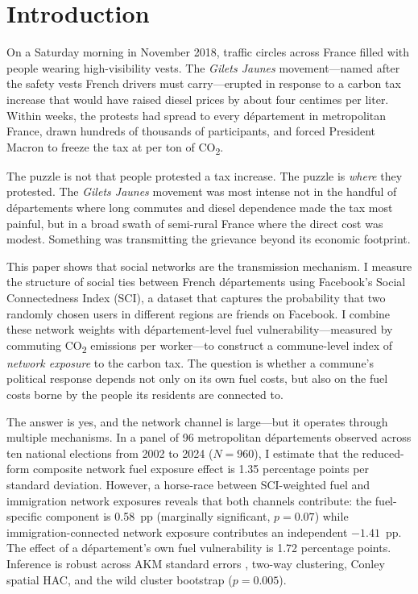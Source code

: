 \documentclass[12pt]{article}
\providecommand{\euro}{\texteuro}
\newcommand{\gj}{\textit{Gilets Jaunes}}
\newcommand{\dept}{d\'{e}partement}
\newcommand{\depts}{d\'{e}partements}
\begin{document}

\section{Introduction}
\label{sec:intro}

On a Saturday morning in November 2018, traffic circles across France filled with people wearing high-visibility vests. The \gj{} movement---named after the safety vests French drivers must carry---erupted in response to a carbon tax increase that would have raised diesel prices by about four centimes per liter. Within weeks, the protests had spread to every \dept{} in metropolitan France, drawn hundreds of thousands of participants, and forced President Macron to freeze the tax at \euro 44.60 per ton of CO\textsubscript{2}.

The puzzle is not that people protested a tax increase. The puzzle is \emph{where} they protested. The \gj{} movement was most intense not in the handful of \depts{} where long commutes and diesel dependence made the tax most painful, but in a broad swath of semi-rural France where the direct cost was modest. Something was transmitting the grievance beyond its economic footprint.

This paper shows that social networks are the transmission mechanism. I measure the structure of social ties between French \depts{} using Facebook's Social Connectedness Index (SCI), a dataset that captures the probability that two randomly chosen users in different regions are friends on Facebook. I combine these network weights with \dept{}-level fuel vulnerability---measured by commuting CO\textsubscript{2} emissions per worker---to construct a commune-level index of \emph{network exposure} to the carbon tax. The question is whether a commune's political response depends not only on its own fuel costs, but also on the fuel costs borne by the people its residents are connected to.

The answer is yes, and the network channel is large---but it operates through multiple mechanisms. In a panel of 96 metropolitan \depts{} observed across ten national elections from 2002 to 2024 ($N = 960$), I estimate that the reduced-form composite network fuel exposure effect is 1.35 percentage points per standard deviation. However, a horse-race between SCI-weighted fuel and immigration network exposures reveals that both channels contribute: the fuel-specific component is 0.58~pp (marginally significant, $p = 0.07$) while immigration-connected network exposure contributes an independent $-1.41$~pp. The effect of a \dept{}'s own fuel vulnerability is 1.72 percentage points. Inference is robust across AKM standard errors \citep{adao2019shift}, two-way clustering, Conley spatial HAC, and the wild cluster bootstrap ($p = 0.005$).
\end{document}
